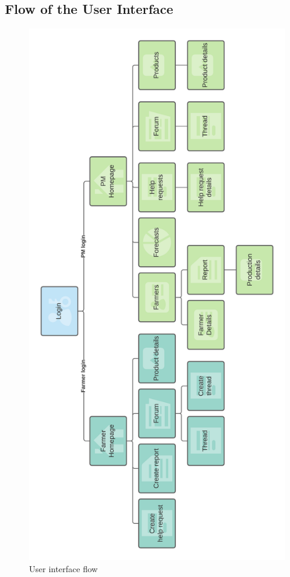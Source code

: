 \documentclass[10pt]{article} %
\begin{document}
\subsection{Flow of the User Interface}
\begin{figure}[h]
    \centering
    \includegraphics[scale=0.6]{images/uimockups/ui_flow.png}
    \caption{User interface flow}
    \label{fig:ui_flow}
\end{figure}
\end{document}
